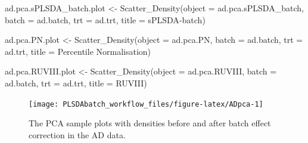 \documentclass[
]{book}
\newenvironment{Shaded}{\begin{snugshade}}{\end{snugshade}}
\newcommand{\AttributeTok}[1]{\textcolor[rgb]{0.77,0.63,0.00}{#1}}
\newcommand{\FunctionTok}[1]{\textcolor[rgb]{0.00,0.00,0.00}{#1}}
\newcommand{\NormalTok}[1]{#1}
\newcommand{\OtherTok}[1]{\textcolor[rgb]{0.56,0.35,0.01}{#1}}
\newcommand{\StringTok}[1]{\textcolor[rgb]{0.31,0.60,0.02}{#1}}
\begin{document}
\begin{Shaded}
\begin{Highlighting}[]
\NormalTok{ad.pca.sPLSDA\_batch.plot }\OtherTok{\textless{}{-}} \FunctionTok{Scatter\_Density}\NormalTok{(}\AttributeTok{object =}\NormalTok{ ad.pca.sPLSDA\_batch, }
                                            \AttributeTok{batch =}\NormalTok{ ad.batch, }
                                            \AttributeTok{trt =}\NormalTok{ ad.trt, }
                                            \AttributeTok{title =} \StringTok{\textquotesingle{}sPLSDA{-}batch\textquotesingle{}}\NormalTok{)}
\end{Highlighting}
\end{Shaded}

\begin{Shaded}
\begin{Highlighting}[]
\NormalTok{ad.pca.PN.plot }\OtherTok{\textless{}{-}} \FunctionTok{Scatter\_Density}\NormalTok{(}\AttributeTok{object =}\NormalTok{ ad.pca.PN, }
                                  \AttributeTok{batch =}\NormalTok{ ad.batch, }
                                  \AttributeTok{trt =}\NormalTok{ ad.trt, }
                                  \AttributeTok{title =} \StringTok{\textquotesingle{}Percentile Normalisation\textquotesingle{}}\NormalTok{)}
\end{Highlighting}
\end{Shaded}

\begin{Shaded}
\begin{Highlighting}[]
\NormalTok{ad.pca.RUVIII.plot }\OtherTok{\textless{}{-}} \FunctionTok{Scatter\_Density}\NormalTok{(}\AttributeTok{object =}\NormalTok{ ad.pca.RUVIII, }
                                      \AttributeTok{batch =}\NormalTok{ ad.batch, }
                                      \AttributeTok{trt =}\NormalTok{ ad.trt, }
                                      \AttributeTok{title =} \StringTok{\textquotesingle{}RUVIII\textquotesingle{}}\NormalTok{)}
\end{Highlighting}
\end{Shaded}

\begin{figure}

{\centering \texttt{[image: PLSDAbatch\_workflow\_files/figure-latex/ADpca-1]} 

}

\caption{The PCA sample plots with densities before and after batch effect correction in the AD data.}\label{fig:ADpca}
\end{figure}
\end{document}
